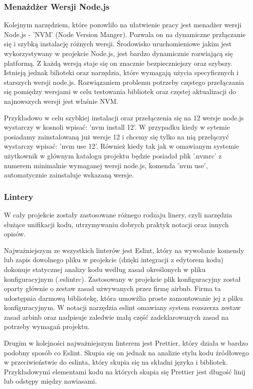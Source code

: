 \subsubsection{Menażdżer Wersji Node.js}
Kolejnym narzędziem, które pozowliło na ułatwienie pracy jest menadżer wersji Node.js - 'NVM' (Node Version Manger).
Pozwala on na dynamiczne przłączanie się i szybką instalację różnych wersji. Środowisko uruchomieniowe jakim jest wykorzystywany w projekcie Node.js, jest bardzo dynamicznie rozwiającą się platformą. Z każdą wersją staje się on znacznie bezpieczniejszy oraz szybszy. Istnieją jednak bilioteki oraz narzędzia, które wymagają użycia specyficznych i starszych wersji node.js. Rozwiązaniem problemu potrzeby częstego przełączania się pomiędzy wersjami w celu testowania bibliotek oraz częstej aktualizacji do najnowszych wersji jest właśnie NVM. 

Przykładowo w celu szybkiej instalacji oraz przełączenia się na 12 wersje node.js wystarczy w kosnoli wpisać: 'nvm install 12'. W przypadku kiedy w sytemie posiadamy zainstalowaną już wersje 12 i chcemy się tylko na nią przełączyć wystarczy wpisać: 'nvm use 12'. Również kiedy tak jak w omawianym systemie użytkownik w głównym katalogu projektu będzie posiadał plik '.nvmrc' z numerem minimalnie wymaganej wersji node.js, komenda 'nvm use', automatycznie zainstaluje wskazaną wersje.


\subsubsection{Lintery}
W cały projekcie zostały zastosowane różnego rodzaju linery, czyli narzędzia służące unifikacji kodu, utrzymywaniu dobrych praktyk notacji oraz innych opisów.

Najważniejszym ze wszystkich linterów jest Eslint, który na wywołanie komendy lub zapis dowolnego pliku w projekcie (dzięki integracji z edytorem kodu) dokonuje statycznej analizy kodu według zasad określonych w pliku konfiguracyjnym (.eslintrc). Zastosowany w projekcie plik konfiguracyjny został oparty głównie o zestaw zasad użwywanych przez firmę airbnb. Firma ta udostępnia darmową bibliotekę, która umowżlia proste zamontowanie jej z pliku konfiguracyjnym. W notacji narzędzia eslint omawiany system rozszerza zestaw zasad arbinb oraz nadpisuje zaledwie małą część zadeklarowanych zasad na potrzeby wymagań projektu.

Drugim w kolejności najważniejszym linterem jest Prettier, który działa w bardzo podobny sposób co Eslint. Skupia się on jednak na analizie stylu kodu źródłowego w przeciwieństwie do eslinta, który skupia się na składni języka i bibliotek. Przykładowymi elementami kodu na których skupia się Prettier jest długość linij lub odstępy między nawiasami.

